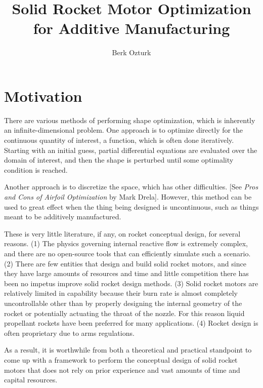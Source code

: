 \documentclass[12pt]{article}
\begin{document}
	
	
	
	\title{Solid Rocket Motor Optimization for Additive Manufacturing}
	\author{Berk Ozturk}
	
	\maketitle
	
	\section{Motivation}
	
There are various methods of performing shape optimization, which is inherently an infinite-dimensional problem. One approach is to optimize directly for the continuous quantity of interest, a function, which is often done iteratively. Starting with an initial guess, partial differential equations are evaluated over the domain of interest, and then the shape is perturbed until some optimality condition is reached. 

Another approach is to discretize the space, which has other difficulties. [See \textit{Pros and Cons of Airfoil Optimization} by Mark Drela]. However, this method can be used to great effect when the thing being designed is uncontinuous, such as things meant to be additively manufactured. 

These is very little literature, if any, on rocket conceptual design, for several reasons. (1) The physics governing internal reactive flow is extremely complex, and there are no open-source tools that can efficiently simulate such a scenario. (2) There are few entities that design and build solid rocket motors, and since they have large amounts of resources and time and little competition there has been no impetus improve solid rocket design methods. (3) Solid rocket motors are relatively limited in capability because their burn rate is almost completely uncontrollable other than by properly designing the internal geometry of the rocket or potentially actuating the throat of the nozzle. For this reason liquid propellant rockets have been preferred for many applications. (4) Rocket design is often proprietary due to arms regulations. 

As a result, it is worthwhile from both a theoretical and practical standpoint to come up with a framework to perform the conceptual design of solid rocket motors that does not rely on prior experience and vast amounts of time and capital resources. 
	
\end{document}
